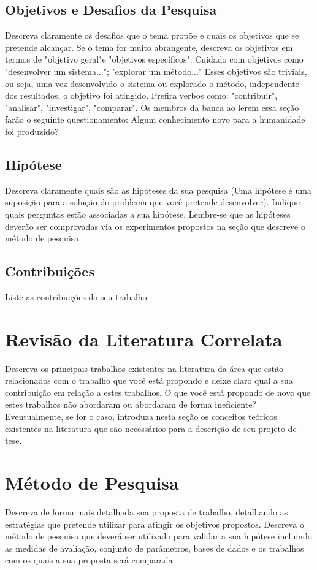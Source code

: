 \documentclass[12pt, a4paper, english, brazil]{article}
\begin{document}
\subsection{Objetivos e Desafios da Pesquisa}
Descreva claramente os desafios que o tema propõe e quais os objetivos que se pretende alcançar. Se o tema for muito abrangente, descreva os objetivos em termos de "objetivo geral"e "objetivos específicos". Cuidado com objetivos como "desenvolver um sistema..."; "explorar um método..." Esses objetivos são triviais, ou seja, uma vez desenvolvido o sistema ou explorado o método, independente dos resultados, o objetivo foi atingido. Prefira verbos como: "contribuir", "analisar", "investigar", "comparar". Os membros da banca ao lerem essa seção farão o seguinte questionamento: Algum conhecimento novo para a humanidade foi produzido?

\subsection{Hipótese}
Descreva claramente quais são as hipóteses da sua pesquisa (Uma hipótese é uma suposição para a solução do problema que você pretende desenvolver). Indique quais perguntas estão associadas a sua hipótese. Lembre-se que as hipóteses deverão ser comprovadas via os experimentos propostos na seção que descreve o método de pesquisa.

\subsection{Contribuições}
Liste as contribuições do seu trabalho. 

\section{Revisão da Literatura Correlata}
Descreva os principais trabalhos existentes na literatura da área que estão relacionados com o trabalho que você está propondo e deixe claro qual a sua contribuição em relação a estes trabalhos. O que você está propondo de novo que estes trabalhos não abordaram ou abordaram de forma ineficiente? Eventualmente, se for o caso, introduza nesta seção os conceitos teóricos existentes na literatura que são necessários para a descrição de seu projeto de tese.

\section{Método de Pesquisa}
Descreva de forma mais detalhada sua proposta de trabalho, detalhando as estratégias que pretende utilizar para atingir os objetivos propostos. Descreva o método de pesquisa que deverá ser utilizado para validar a sua hipótese incluindo as medidas de avaliação, conjunto de parâmetros, bases de dados e os trabalhos com os quais a sua proposta será comparada.
\end{document}
